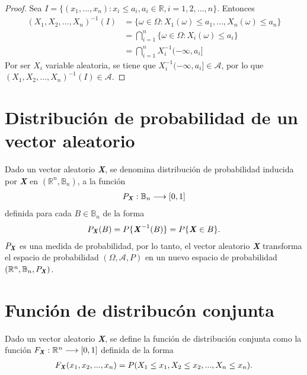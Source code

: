 \begin{proof}
    Sea $I = \{ (x_1,...,x_n) : x_i \leq a_i, a_i \in \mathbb{R}, i = 1,2,...,n \}$. Entonces
    \begin{align*}
        (X_1,X_2,...,X_n)^{-1}(I) & = \{ \omega \in \Omega : X_1(\omega) \leq a_1, ..., X_n(\omega) \leq a_n \} \\
                                  & = \bigcap_{i=1}^{n}{\{ \omega \in \Omega : X_i(\omega) \leq a_i \}}         \\
                                  & = \bigcap_{i=1}^{n}{X_i^{-1}(-\infty,a_i]}
    \end{align*}
    Por ser $X_i$ variable aleatoria, se tiene que $X_i^{-1}(-\infty,a_i] \in \mathcal{A}$, por lo que $(X_1,X_2,...,X_n)^{-1}(I) \in \mathcal{A}$.
\end{proof}

\section{Distribución de probabilidad de un vector aleatorio}

Dado un vector aleatorio \textbf{\textit{X}}, se denomina distribución de probabilidad inducida por \textbf{\textit{X}} en $(\mathbb{R}^n, \mathbb{B}_n)$, a la función
\begin{align*}
    P_{\textbf{\textit{X}}} : \mathbb{B}_n \longrightarrow [0,1]
\end{align*}
definida para cada $B \in \mathbb{B}_n$ de la forma
\begin{align*}
    P_{\textbf{\textit{X}}}(B) = P\{ \textbf{\textit{X}}^{-1}(B) \} = P\{\textbf{\textit{X}} \in B \}.
\end{align*}
$P_{\textbf{\textit{X}}}$ es una medida de probabilidad, por lo tanto, el vector aleatorio \textbf{\textit{X}} transforma el espacio de probabilidad $(\Omega, \mathcal{A}, P)$ en un nuevo espacio de probabilidad $(\mathbb{R}^n, \mathbb{B}_n, P_{\textbf{\textit{X}}})$.

\section{Función de distribucón conjunta}

Dado un vector aleatorio \textbf{\textit{X}}, se define la función de distribución conjunta como la función $F_{\textbf{\textit{X}}} : \mathbb{R}^n \longrightarrow [0,1]$ definida de la forma
\begin{align*}
    F_{\textbf{\textit{X}}}(x_1,x_2,...,x_n) = P(X_1 \leq x_1, X_2 \leq x_2, ..., X_n \leq x_n).
\end{align*}

